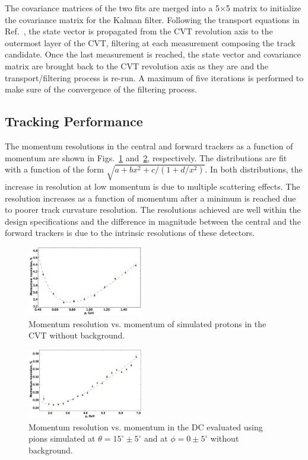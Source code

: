 The covariance matrices of the two fits are merged into a 5$\times$5 matrix to initialize the covariance matrix
for the Kalman filter. Following the transport equations in Ref.~\cite{ILC-Tracking}, the state vector is
propagated from the CVT revolution axis to the outermost layer of the CVT, filtering at each measurement
composing the track candidate. Once the last measurement is reached, the state vector and covariance matrix
are brought back to the CVT revolution axis as they are and the transport/filtering process is re-run. A maximum
of five iterations is performed to make sure of the convergence of the filtering process.

\subsection{Tracking Performance}

The momentum resolutions in the central and forward trackers as a function of momentum are shown in
Figs.~\ref{fig:respcvt} and~\ref{fig:respdc}, respectively. The distributions are fit with a function of the form
$\sqrt{a+b x^2+c/(1+d/x^2)}$.  In both distributions, the increase in resolution at low momentum is due to multiple scattering effects.  The resolution increases as a function of momentum after a minimum is reached due to poorer track curvature resolution.  The resolutions achieved are well within the design specifications and the
difference in magnitude between the central and the forward trackers is due to the intrinsic resolutions of these
detectors. 

\begin{figure}
\includegraphics[width=0.45\textwidth]{pics/fddegipekmpjjiho.png}
\caption{Momentum resolution vs. momentum of simulated protons in the CVT without background.}
\label{fig:respcvt}
\end{figure}

\begin{figure}
\includegraphics[width=0.45\textwidth]{pics/DCRes.png}
\caption{Momentum resolution vs. momentum in the DC evaluated using pions simulated at
  $\theta =15^\circ \pm 5^\circ$ and at $\phi = 0 \pm 5^\circ$ without background.}
\label{fig:respdc}
\end{figure}

